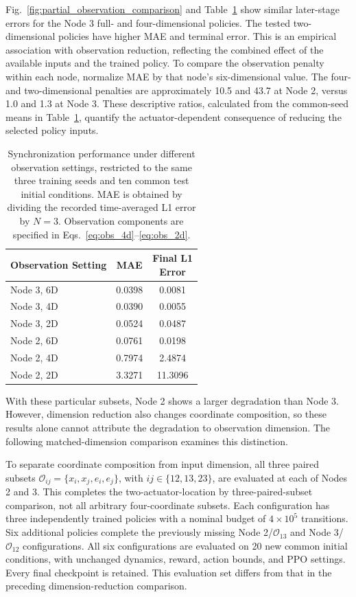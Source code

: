 \documentclass[a4paper,fleqn]{cas-sc}
\theoremstyle{plain}
\theoremstyle{definition}
\begin{document}
Fig.~\ref{fig:partial_observation_comparison} and Table~\ref{tab:partial_observation} show similar later-stage errors for the Node 3 full- and four-dimensional policies. The tested two-dimensional policies have higher MAE and terminal error. This is an empirical association with observation reduction, reflecting the combined effect of the available inputs and the trained policy. To compare the observation penalty within each node, normalize MAE by that node's six-dimensional value. The four- and two-dimensional penalties are approximately 10.5 and 43.7 at Node 2, versus 1.0 and 1.3 at Node 3. These descriptive ratios, calculated from the common-seed means in Table~\ref{tab:partial_observation}, quantify the actuator-dependent consequence of reducing the selected policy inputs.

\begin{table}[pos=h,width=\linewidth]
	\centering
	\setlength{\tabcolsep}{3pt}
	\renewcommand{\arraystretch}{1.12}
	\caption{Synchronization performance under different observation settings, restricted to the same three training seeds and ten common test initial conditions. MAE is obtained by dividing the recorded time-averaged L1 error by $N=3$. Observation components are specified in Eqs.~\ref{eq:obs_4d}--\ref{eq:obs_2d}.}
	\label{tab:partial_observation}
	\begin{tabular}{@{}lcc@{}}
		\toprule
		Observation Setting & MAE & \makecell{Final L1\\Error} \\
		\midrule
		Node 3, 6D & 0.0398 & 0.0081 \\
		Node 3, 4D & 0.0390 & 0.0055 \\
		Node 3, 2D & 0.0524 & 0.0487 \\
		Node 2, 6D & 0.0761 & 0.0198 \\
		Node 2, 4D & 0.7974 & 2.4874 \\
		Node 2, 2D & 3.3271 & 11.3096 \\
		\bottomrule
	\end{tabular}
\end{table}

With these particular subsets, Node 2 shows a larger degradation than Node 3. However, dimension reduction also changes coordinate composition, so these results alone cannot attribute the degradation to observation dimension. The following matched-dimension comparison examines this distinction.

To separate coordinate composition from input dimension, all three paired subsets $\mathcal O_{ij}=\{x_i,x_j,e_i,e_j\}$, with $ij\in\{12,13,23\}$, are evaluated at each of Nodes 2 and 3. This completes the two-actuator-location by three-paired-subset comparison, not all arbitrary four-coordinate subsets. Each configuration has three independently trained policies with a nominal budget of $4\times10^5$ transitions. Six additional policies complete the previously missing Node 2/$\mathcal O_{13}$ and Node 3/$\mathcal O_{12}$ configurations. All six configurations are evaluated on 20 new common initial conditions, with unchanged dynamics, reward, action bounds, and PPO settings. Every final checkpoint is retained. This evaluation set differs from that in the preceding dimension-reduction comparison.
\end{document}
